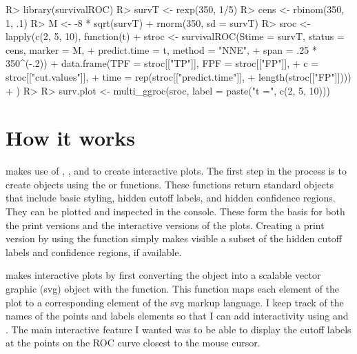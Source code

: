 \documentclass[codesnippet]{jss}
\begin{document}
\begin{Schunk}
\begin{Sinput}
R> library(survivalROC)
R> survT <- rexp(350, 1/5)
R> cens <- rbinom(350, 1, .1)
R> M <- -8 * sqrt(survT) + rnorm(350, sd = survT)
R> sroc <- lapply(c(2, 5, 10), function(t){ 
+   stroc <- survivalROC(Stime = survT, status = cens, marker = M, 
+                        predict.time = t, method = "NNE", 
+                        span = .25 * 350^(-.2))
+   data.frame(TPF = stroc[["TP"]], FPF = stroc[["FP"]], 
+              c = stroc[["cut.values"]], 
+              time = rep(stroc[["predict.time"]], 
+                         length(stroc[["FP"]])))
+   })
R> 
R> surv.plot <- multi_ggroc(sroc, label = paste("t =", c(2, 5, 10)))
\end{Sinput}
\end{Schunk}

\section{How it works}\label{how-it-works}

 makes use of  \citep{ggplot2}, 
\citep{gridsvg}, and  \citep{bostock2011d3} to create
interactive plots. The first step in the process is to create
 objects using the  or 
functions. These functions return standard  objects that
include basic styling, hidden cutoff labels, and hidden confidence
regions. They can be plotted and inspected in the  console.
These form the basis for both the print versions and the interactive
versions of the plots. Creating a print version by using the
 function simply makes visible a subset of the
hidden cutoff labels and confidence regions, if available.

 makes interactive plots by first converting the
 object into a scalable vector graphic (svg) object with
the  function. This function maps each
element of the plot to a corresponding element of the svg markup
language. I keep track of the names of the points and labels elements so
that I can add interactivity using  and
. The main interactive feature I wanted was to be
able to display the cutoff labels at the points on the ROC curve closest
to the mouse cursor.
\end{document}

